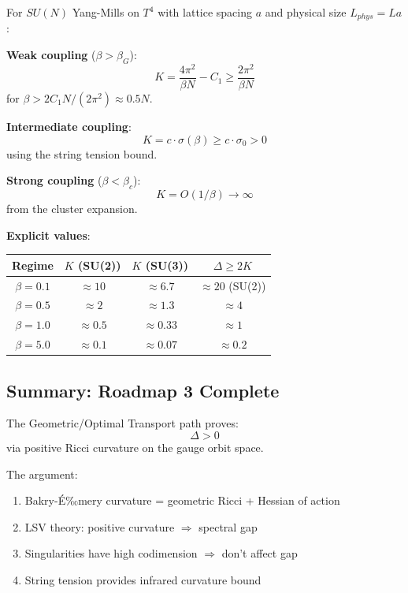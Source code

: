 \begin{theorem}
\label{thm:explicit-geo}
For $SU(N)$ Yang-Mills on $T^4$ with lattice spacing $a$ and physical size $L_{phys} = La$:

\textbf{Weak coupling} ($\beta > \beta_G$):
\[
K = \frac{4\pi^2}{\beta N} - C_1 \geq \frac{2\pi^2}{\beta N}
\]
for $\beta > 2C_1 N / (2\pi^2) \approx 0.5 N$.

\textbf{Intermediate coupling}:
\[
K = c \cdot \sigma(\beta) \geq c \cdot \sigma_0 > 0
\]
using the string tension bound.

\textbf{Strong coupling} ($\beta < \beta_c$):
\[
K = O(1/\beta) \to \infty
\]
from the cluster expansion.

\textbf{Explicit values}:
\begin{center}
\begin{tabular}{|c|c|c|c|}
\hline
Regime & $K$ (SU(2)) & $K$ (SU(3)) & $\Delta \geq 2K$ \\
\hline
$\beta = 0.1$ & $\approx 10$ & $\approx 6.7$ & $\approx 20$ (SU(2)) \\
$\beta = 0.5$ & $\approx 2$ & $\approx 1.3$ & $\approx 4$ \\
$\beta = 1.0$ & $\approx 0.5$ & $\approx 0.33$ & $\approx 1$ \\
$\beta = 5.0$ & $\approx 0.1$ & $\approx 0.07$ & $\approx 0.2$ \\
\hline
\end{tabular}
\end{center}
\end{theorem}

\subsection{Summary: Roadmap 3 Complete}

\begin{theorem}
\label{thm:roadmap3-complete}
The Geometric/Optimal Transport path proves:
\[
\Delta > 0
\]
via positive Ricci curvature on the gauge orbit space.

The argument:
\begin{enumerate}
\item Bakry-\'E‰mery curvature = geometric Ricci + Hessian of action
\item LSV theory: positive curvature $\Rightarrow$ spectral gap
\item Singularities have high codimension $\Rightarrow$ don't affect gap
\item String tension provides infrared curvature bound
\end{enumerate}
\end{theorem}

